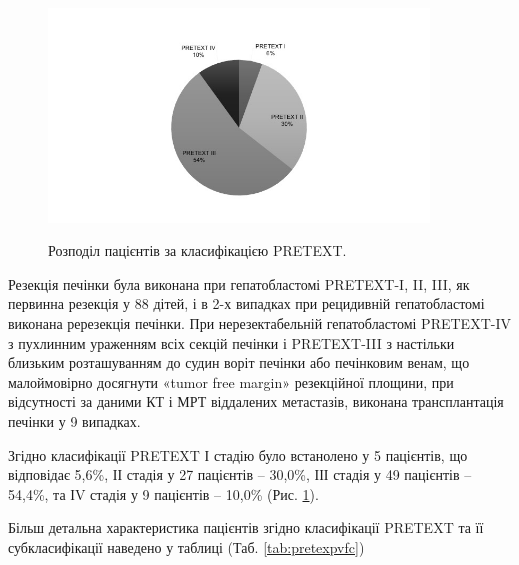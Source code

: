 \begin{figure}[h]
\centering
\includegraphics[width=0.9\textwidth]{Illustrations/pretexpac.jpeg}
\label{fig:pretexpac} %
\caption{Розподіл пацієнтів за класифікацією PRETEXT.}
\end{figure}


Резекція печінки була виконана при гепатобластомі PRETEXT-I, II, III, як первинна резекція у 88 дітей, і в 2-х випадках при рецидивній гепатобластомі виконана ререзекція печінки. При нерезектабельній гепатобластомі PRETEXT-IV з пухлинним ураженням всіх секцій печінки і PRETEXT-III з настільки близьким розташуванням до судин воріт печінки або печінковим венам, що малоймовірно досягнути «tumor free margin» резекційної площини, при відсутності за даними КТ і МРТ віддалених метастазів, виконана трансплантація печінки у 9 випадках.

Згідно класифікації PRETEXT І стадію було встанолено у 5 пацієнтів, що відповідає 5,6\%, ІІ стадія у 27 пацієнтів – 30,0\%, ІІІ стадія у 49 пацієнтів – 54,4\%, та ІV стадія у 9 пацієнтів – 10,0\% (Рис. \ref{fig:pretexpac}).

Більш детальна характеристика пацієнтів згідно класифікації PRETEXT та її субкласифікації наведено у таблиці (Таб. \ref{tab:pretexpvfc})

